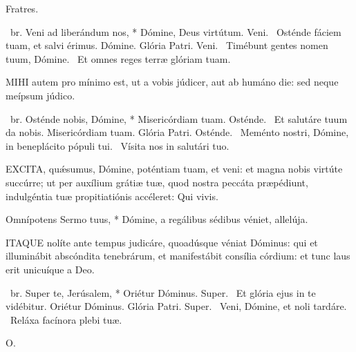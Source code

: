 
 Fratres.

\R\ br. Veni ad liberándum nos, * Dómine, Deus virtútum. Veni. \V\ Osténde fáciem tuam, et salvi érimus. Dómine. Glória Patri. Veni. \V\ Timébunt gentes nomen tuum, Dómine. \R\ Et omnes reges terræ glóriam tuam.



\lettrine[lines=2]{M}{IHI} autem pro mínimo est, ut a vobis júdicer, aut ab humáno die: sed neque meípsum júdico.

\R\ br. Osténde nobis, Dómine, * Misericórdiam tuam. Osténde. \V\ Et salutáre tuum da nobis. Misericórdiam tuam. Glória Patri. Osténde. \V\ Meménto nostri, Dómine, in beneplácito pópuli tui. \R\ Vísita nos in salutári tuo.


\lettrine[lines=2]{E}{XCITA}, quǽsumus, Dómine, poténtiam tuam, et veni: et magna nobis virtúte succúrre; ut per auxílium grátiæ tuæ, quod nostra peccáta præpédiunt, indulgéntia tuæ propitiatiónis accéleret: Qui vivis.


 Omnípotens Sermo tuus, * Dómine, a regálibus sédibus véniet, allelúja.


\lettrine[lines=2]{I}{TAQUE} nolíte ante tempus judicáre, quoadúsque véniat Dóminus: qui et illuminábit abscóndita tenebrárum, et manifestábit consília córdium: et tunc laus erit unicuíque a Deo.

\R\ br. Super te, Jerúsalem, * Oriétur Dóminus. Super. \V\ Et glória ejus in te vidébitur. Oriétur Dóminus. Glória Patri. Super. \V\ Veni, Dómine, et noli tardáre. \R\ Reláxa facínora plebi tuæ.




 O. 

\sectionornament




